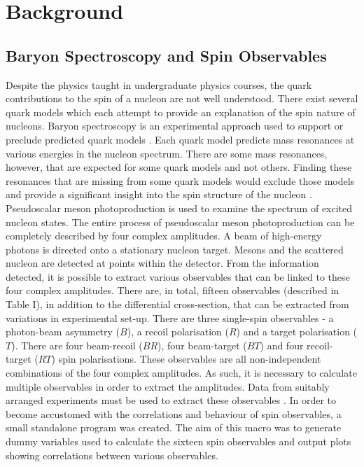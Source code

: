\documentclass[a4paper,12pt]{article}
\begin{document}
\section{Background}
\subsection{Baryon Spectroscopy and Spin Observables} 
Despite the physics taught in undergraduate physics courses, the quark contributions to the spin of a nucleon are not well understood.  There exist several quark models which each attempt to provide an explanation of the spin nature of nucleons.  Baryon spectroscopy is an experimental approach used to support or preclude predicted quark models \cite{klempt}.  Each quark model predicts mass resonances at various energies in the nucleon spectrum.  There are some mass resonances, however, that are expected for some quark models and not others.  Finding these resonances that are missing from some quark models would exclude those models and provide a significant insight into the spin structure of the nucleon \cite{nstar, klempt}.
\newline
Pseudoscalar meson photoproduction is used to examine the spectrum of excited nucleon states.  The entire process of pseudoscalar meson photoproduction can be completely described by four complex amplitudes.  A beam of high-energy photons is directed onto a stationary nucleon target.  Mesons and the scattered nucleon are detected at points within the detector.  From the information detected, it is possible to extract various observables that can be linked to these four complex amplitudes.  There are, in total, fifteen observables (described in Table I), in addition to the differential cross-section, that can be extracted from variations in experimental set-up.  There are three single-spin observables - a photon-beam asymmetry ($B$), a recoil polarisation ($R$) and a target polarisation ($T$).  There are four beam-recoil ($BR$), four beam-target ($BT$) and four recoil-target ($RT$) spin polarisations.  These observables are all non-independent combinations of the four complex amplitudes.  As such, it is necessary to calculate multiple observables in order to extract the amplitudes. Data from suitably arranged experiments must be used to extract these observables \cite{nstar, info}.
\newline
In order to become accustomed with the correlations and behaviour of spin observables, a small standalone program was created.  The aim of this macro was to generate dummy variables used to calculate the sixteen spin observables and output plots showing correlations between various observables.
\end{document}
